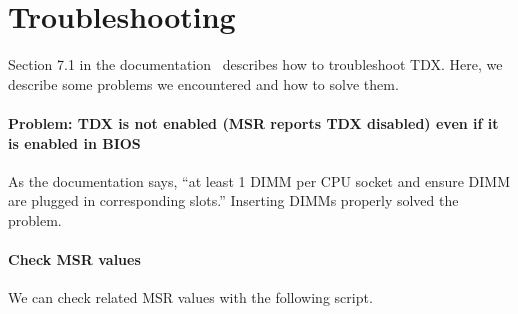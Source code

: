 \documentclass[letterpaper,twocolumn,10pt]{article}
\newcommand{\myparagraph}{\paragraph}
\begin{document}
\section{Troubleshooting}
Section 7.1 in the documentation~\cite{linux-stacks-for-intel-tdx-2023ww01} describes how to troubleshoot TDX.
Here, we describe some problems we encountered and how to solve them.

\myparagraph{Problem: TDX is not enabled (MSR reports TDX disabled) even if it is enabled in BIOS}
As the documentation says, ``at least 1 DIMM per CPU socket and ensure DIMM are plugged in corresponding slots.''
Inserting DIMMs properly solved the problem.

\myparagraph{Check MSR values}
We can check related MSR values with the following script.


\end{document}
